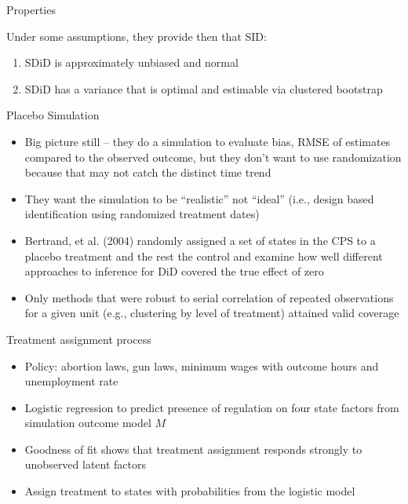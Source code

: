 \documentclass{beamer}
\begin{document}
\begin{frame}{Properties}

Under some assumptions, they provide then that SID:

\begin{enumerate}
\item SDiD is approximately unbiased and normal
\item SDiD has a variance that is optimal and estimable via clustered bootstrap
\end{enumerate}


\end{frame}




\begin{frame}{Placebo Simulation}

\begin{itemize}
\item Big picture still -- they do a simulation to evaluate bias, RMSE of estimates compared to the observed outcome, but they don't want to use randomization because that may not catch the distinct time trend
\item They want the simulation to be ``realistic'' not ``ideal'' (i.e., design based identification using randomized treatment dates)
\item  Bertrand, et al. (2004)  randomly assigned a set of states in the CPS to a placebo treatment and the rest the control and examine how well different approaches to inference for DiD covered the true effect of zero
\item Only methods that were robust to serial correlation of repeated observations for a given unit (e.g., clustering by level of treatment) attained valid coverage
\end{itemize}

\end{frame}



\begin{frame}{Treatment assignment process}

\begin{itemize}
\item Policy: abortion laws, gun laws, minimum wages with outcome hours and unemployment rate
\item Logistic regression to predict presence of regulation on four state factors from simulation outcome model $M$
\item Goodness of fit shows that treatment assignment responds strongly to unobserved latent factors
\item Assign treatment to states with probabilities from the logistic model
\end{itemize}

\end{frame}
\end{document}
